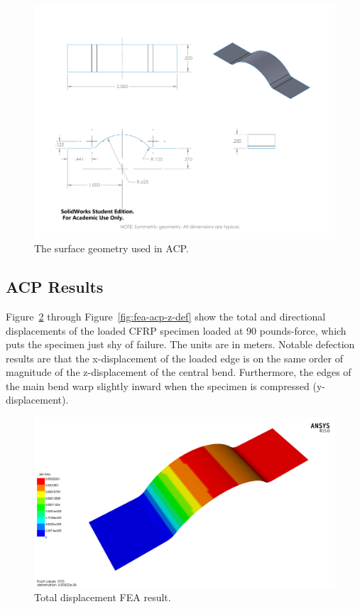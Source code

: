 \begin{figure}[htp]
\centering
\includegraphics[width=1\textwidth]{./figures/fea/fea-surface-geometry}
\caption{The surface geometry used in ACP.}
\label{fig:fea-bridge-speciment}
\end{figure}

\clearpage

\subsection{ACP Results}

\indent

Figure~\ref{fig:fea-acp-tot-def} through Figure~\ref{fig:fea-acp-z-def} show the total and directional displacements of the loaded CFRP specimen loaded at 90 pounds-force, which puts the specimen just shy of failure. The units are in meters. Notable defection results are that the x-displacement of the loaded edge is on the same order of magnitude of the z-displacement of the central bend. Furthermore, the edges of the main bend warp slightly inward when the specimen is compressed (y-displacement).


\begin{figure}[htp]
\centering
\includegraphics[width=1\textwidth]{./figures/fea/fea-acp-tot-def}
\caption{Total displacement FEA result.}
\label{fig:fea-acp-tot-def}
\end{figure}

